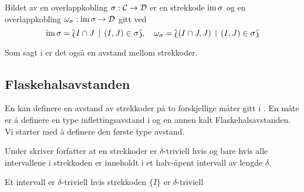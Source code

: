 \begin{teorem}\label{trm:im}
  Bildet av en overlappkobling $\sigma:\mathcal{C}\to\mathcal{D}$ er
  en strekkode $\textnormal{im}\,\sigma$ og en overlappkobling
  $\omega_\sigma:\textnormal{im}\,\sigma\to\mathcal{D}$ gitt ved
  \[\textnormal{im}\,\sigma = \Lbag I\cap J\,\mid\, (I,J)\in\sigma\Rbag,\quad
  \omega_\sigma = \Lbag (I\cap J, J)\,\mid\, (I,J)\in\sigma\Rbag\]
\end{teorem}

Som sagt i  er det også en
avstand mellom strekkoder.

\subsection{Flaskehalsavstanden}
En kan definere en avstand av strekkoder på to
forskjellige måter gitt i \cite{Bauer2020}. En måte er
å definere en type inflettingsavstand i \Barc og en annen
kalt Flaskehalsavstanden. Vi starter med å definere den
første type avstand.

\begin{bemerk}\label{bem:strek_triv}
  Under \citep[definisjon 1.3]{Bauer2020} skriver
  forfatter at en strekkoder er $\delta$-triviell hvis og
  bare hvis alle intervallene i strekkoden er inneholdt
  i et halv-åpent intervall av lengde $\delta$.
\end{bemerk}

\begin{bemerk}\label{bem:int_triv}
  Et intervall er $\delta$-triviell hvis strekkoden
  $\{I\}$ er $\delta$-triviell
\end{bemerk}

